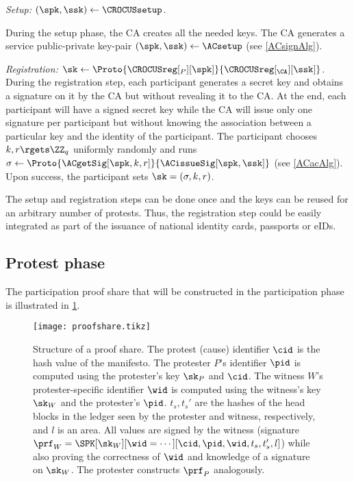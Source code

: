 \emph{Setup: \((\spk, \ssk)\gets \CROCUSsetup\).}


During the setup phase, the \ac{CA} creates all the needed keys.
The \ac{CA} generates a service public-private key-pair \((\spk, \ssk)\gets 
  \ACsetup\) (see \cref{ACsignAlg}).

\emph{Registration: \(\sk\gets 
    \Proto{\CROCUSreg[_P][\spk]}{\CROCUSreg[_{\CA}][\ssk]}\).}
During the registration step, each participant generates a secret key and 
obtains a signature on it by the \ac{CA} but without revealing it to the 
\ac{CA}.
At the end, each participant will have a signed secret key while the \ac{CA} 
will issue only one signature per participant but without knowing the 
association between a particular key and the identity of the participant.
The participant chooses \(k, r\rgets \ZZ_q\) uniformly randomly and runs 
\(\sigma \gets \Proto{\ACgetSig[\spk, k, r]}{\ACissueSig[\spk, \ssk]}\) (see 
\cref{ACacAlg}).
Upon success, the participant sets \(\sk = (\sigma, k, r)\).

The setup and registration steps can be done once and the keys can be reused 
for an arbitrary number of protests.
Thus, the registration step could be easily integrated as part of the issuance 
of national identity cards, passports or \acp{eID}.

\subsection{Protest phase}%
\label{ProtocolDuring}



The participation proof share that will be constructed in the
participation phase is illustrated in \cref{fig:ProofFig}.

\begin{figure}
  \centering
  \small
  \texttt{[image: proofshare.tikz]}
  \caption{%
    Structure of a proof share.
    The protest (cause) identifier \(\cid\) is the hash value of the manifesto.
    The protester \(P\)'s identifier \(\pid\) is computed using the protester's key \(\sk_P\) and \(\cid\).
    The witness \(W\)'s protester-specific identifier \(\wid\) is computed using the
    witness's key \(\sk_W\) and the protester's \(\pid\).
    \(t_s, t_s'\) are the hashes of the head blocks in the ledger seen by the 
    protester and witness, respectively, and \(l\) is an area.
    All values are signed by the witness (signature \(\prf_W = \SPK[\sk_W][\wid 
      = \dotsb][\cid, \pid, \wid, t_s, t_s', l]\)) while also proving the 
    correctness of \(\wid\) and knowledge of a signature on \(\sk_W\).
    The protester constructs \(\prf_P\) analogously.
  }%
  \label{fig:ProofFig}
\end{figure}%


